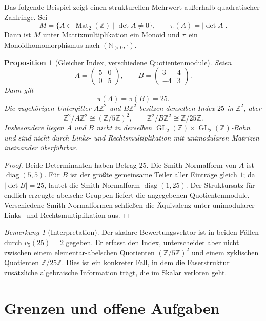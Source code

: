 \documentclass[11pt,a4paper,reqno]{amsart}
\newtheorem{proposition}[theorem]{Proposition}
\theoremstyle{definition}
\theoremstyle{remark}
\newtheorem{remark}[theorem]{Bemerkung}
\newcommand{\Npos}{\mathbb{N}_{>0}}
\newcommand{\Z}{\mathbb{Z}}
\newcommand{\GL}{\operatorname{GL}}
\begin{document}
Das folgende Beispiel zeigt einen strukturellen Mehrwert außerhalb quadratischer Zahlringe. Sei
\[
  M=\{A\in\operatorname{Mat}_2(\Z)\mid\det A\neq0\},
  \qquad
  \pi(A)=|\det A|.
\]
Dann ist $M$ unter Matrixmultiplikation ein Monoid und $\pi$ ein Monoidhomomorphismus nach $(\Npos,\cdot)$.

\begin{proposition}[Gleicher Index, verschiedene Quotientenmodule]
Seien
\[
  A=\begin{pmatrix}5&0\\0&5\end{pmatrix},
  \qquad
  B=\begin{pmatrix}3&4\\-4&3\end{pmatrix}.
\]
Dann gilt
\[
  \pi(A)=\pi(B)=25.
\]
Die zugehörigen Untergitter $A\Z^2$ und $B\Z^2$ besitzen denselben Index $25$ in $\Z^2$, aber
\[
  \Z^2/A\Z^2\cong(\Z/5\Z)^2,
  \qquad
  \Z^2/B\Z^2\cong\Z/25\Z.
\]
Insbesondere liegen $A$ und $B$ nicht in derselben $\GL_2(\Z)\times\GL_2(\Z)$-Bahn und sind nicht durch Links- und Rechtsmultiplikation mit unimodularen Matrizen ineinander überführbar.
\end{proposition}

\begin{proof}
Beide Determinanten haben Betrag $25$. Die Smith-Normalform von $A$ ist $\operatorname{diag}(5,5)$. Für $B$ ist der größte gemeinsame Teiler aller Einträge gleich $1$; da $|\det B|=25$, lautet die Smith-Normalform $\operatorname{diag}(1,25)$. Der Struktursatz für endlich erzeugte abelsche Gruppen liefert die angegebenen Quotientenmodule. Verschiedene Smith-Normalformen schließen die Äquivalenz unter unimodularer Links- und Rechtsmultiplikation aus.
\end{proof}

\begin{remark}[Interpretation]
Der skalare Bewertungsvektor ist in beiden Fällen durch $v_5(25)=2$ gegeben. Er erfasst den Index, unterscheidet aber nicht zwischen einem elementar-abelschen Quotienten $(\Z/5\Z)^2$ und einem zyklischen Quotienten $\Z/25\Z$. Dies ist ein konkreter Fall, in dem die Faserstruktur zusätzliche algebraische Information trägt, die im Skalar verloren geht.
\end{remark}

\section{Grenzen und offene Aufgaben}
\end{document}
